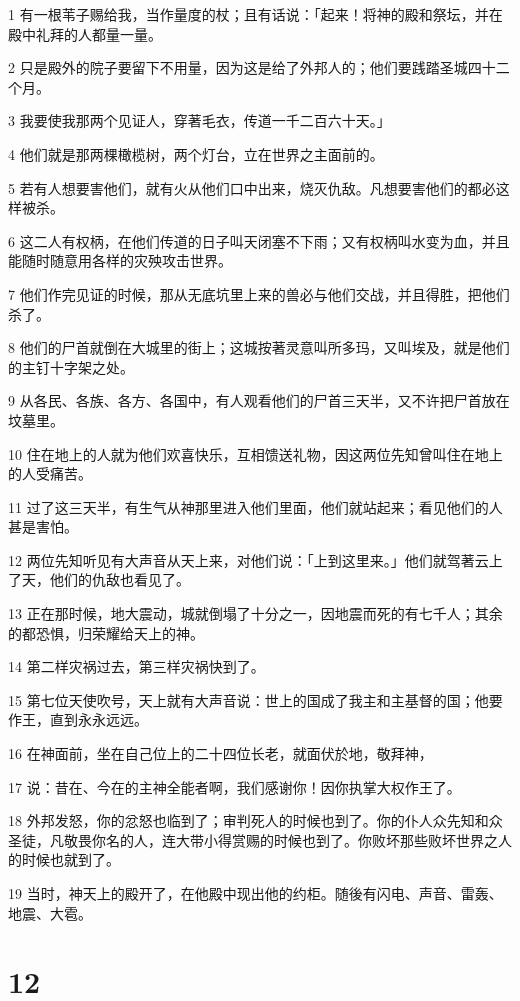 \par 1 有一根苇子赐给我，当作量度的杖；且有话说：「起来！将神的殿和祭坛，并在殿中礼拜的人都量一量。
\par 2 只是殿外的院子要留下不用量，因为这是给了外邦人的；他们要践踏圣城四十二个月。
\par 3 我要使我那两个见证人，穿著毛衣，传道一千二百六十天。」
\par 4 他们就是那两棵橄榄树，两个灯台，立在世界之主面前的。
\par 5 若有人想要害他们，就有火从他们口中出来，烧灭仇敌。凡想要害他们的都必这样被杀。
\par 6 这二人有权柄，在他们传道的日子叫天闭塞不下雨；又有权柄叫水变为血，并且能随时随意用各样的灾殃攻击世界。
\par 7 他们作完见证的时候，那从无底坑里上来的兽必与他们交战，并且得胜，把他们杀了。
\par 8 他们的尸首就倒在大城里的街上；这城按著灵意叫所多玛，又叫埃及，就是他们的主钉十字架之处。
\par 9 从各民、各族、各方、各国中，有人观看他们的尸首三天半，又不许把尸首放在坟墓里。
\par 10 住在地上的人就为他们欢喜快乐，互相馈送礼物，因这两位先知曾叫住在地上的人受痛苦。
\par 11 过了这三天半，有生气从神那里进入他们里面，他们就站起来；看见他们的人甚是害怕。
\par 12 两位先知听见有大声音从天上来，对他们说：「上到这里来。」他们就驾著云上了天，他们的仇敌也看见了。
\par 13 正在那时候，地大震动，城就倒塌了十分之一，因地震而死的有七千人；其余的都恐惧，归荣耀给天上的神。
\par 14 第二样灾祸过去，第三样灾祸快到了。
\par 15 第七位天使吹号，天上就有大声音说：世上的国成了我主和主基督的国；他要作王，直到永永远远。
\par 16 在神面前，坐在自己位上的二十四位长老，就面伏於地，敬拜神，
\par 17 说：昔在、今在的主神全能者啊，我们感谢你！因你执掌大权作王了。
\par 18 外邦发怒，你的忿怒也临到了；审判死人的时候也到了。你的仆人众先知和众圣徒，凡敬畏你名的人，连大带小得赏赐的时候也到了。你败坏那些败坏世界之人的时候也就到了。
\par 19 当时，神天上的殿开了，在他殿中现出他的约柜。随後有闪电、声音、雷轰、地震、大雹。

\chapter{12}

